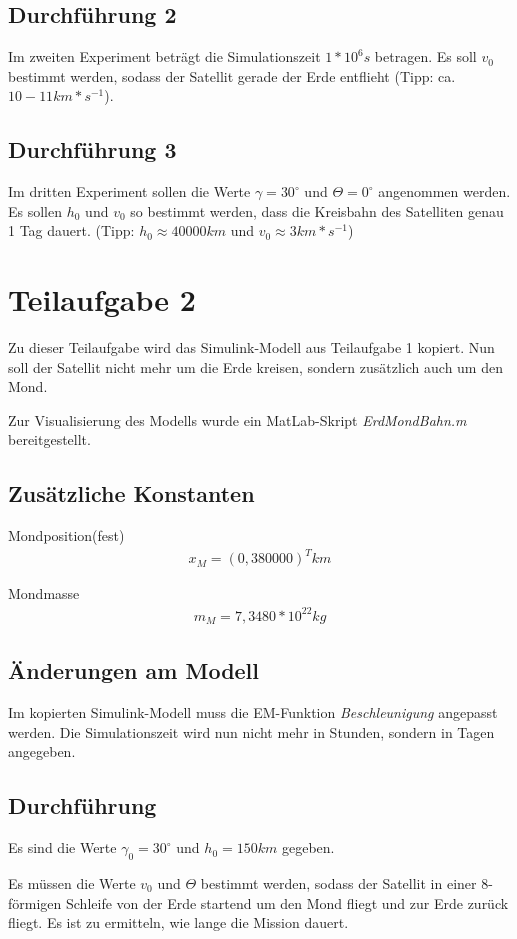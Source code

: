 \documentclass[]{scrartcl}
\begin{document}
\subsection{Durchführung 2}
Im zweiten Experiment beträgt die Simulationszeit $1 * 10^6s$ betragen. Es soll $v_{0}$ bestimmt werden, sodass der Satellit gerade der Erde entflieht (Tipp: ca. $10 - 11 km*s^{-1}$).

\subsection{Durchführung 3}
Im dritten Experiment sollen die Werte $\gamma = 30^\circ$ und $\Theta = 0^\circ$ angenommen werden. Es sollen $h_{0}$ und $v_{0}$ so bestimmt werden, dass die Kreisbahn des Satelliten genau 1 Tag dauert. (Tipp: $h_{0} \approx 40000 km$ und $v_{0} \approx 3 km *s ^{-1}$)

\section{Teilaufgabe 2}
Zu dieser Teilaufgabe wird das Simulink-Modell aus Teilaufgabe 1 kopiert. Nun soll der Satellit nicht mehr um die Erde kreisen, sondern zusätzlich auch um den Mond.

Zur Visualisierung des Modells wurde ein MatLab-Skript \textit{ErdMondBahn.m} bereitgestellt.

\subsection{Zusätzliche Konstanten}
Mondposition(fest)
\begin{align}
x_{M} = (0,380000)^T km
\end{align}

Mondmasse
\begin{align}
m_{M} = 7,3480 * 10^{22} kg
\end{align}

\subsection{Änderungen am Modell}
Im kopierten Simulink-Modell muss die EM-Funktion \textit{Beschleunigung} angepasst werden. %
Die Simulationszeit wird nun nicht mehr in Stunden, sondern in Tagen angegeben.

\subsection{Durchführung}
Es sind die Werte $\gamma_{0} = 30^\circ$ und $h_{0} = 150km$ gegeben.

Es müssen die Werte $v_{0}$ und $\Theta$ bestimmt werden, sodass der Satellit in einer 8-förmigen Schleife von der Erde startend um den Mond fliegt und zur Erde zurück fliegt. Es ist zu ermitteln, wie lange die Mission dauert.
\end{document}
